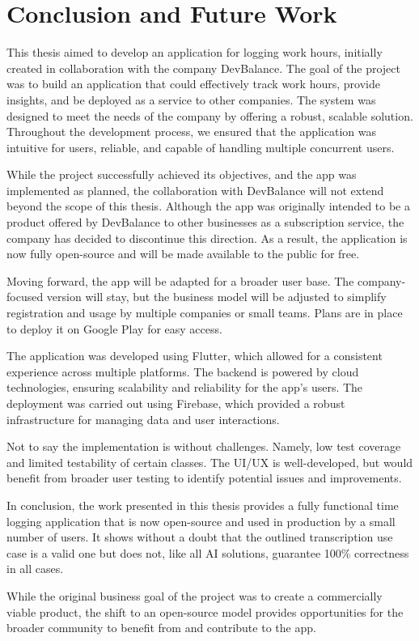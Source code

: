\documentclass[
  digital,     %
  oneside,     %
  nosansbold,  %
  nocolorbold, %
  lof,         %
  lot,         %
]{fithesis4}
\begin{document}
\chapter{Conclusion and Future Work}
\shorthandoff{-}
\begin{markdown}

This thesis aimed to develop an application for logging work hours, initially created in collaboration with the company DevBalance. The goal of the project was to build an application that could effectively track work hours, provide insights, and be deployed as a service to other companies. The system was designed to meet the needs of the company by offering a robust, scalable solution. Throughout the development process, we ensured that the application was intuitive for users, reliable, and capable of handling multiple concurrent users.

While the project successfully achieved its objectives, and the app was implemented as planned, the collaboration with DevBalance will not extend beyond the scope of this thesis. Although the app was originally intended to be a product offered by DevBalance to other businesses as a subscription service, the company has decided to discontinue this direction. As a result, the application is now fully open-source and will be made available to the public for free.

Moving forward, the app will be adapted for a broader user base. The company-focused version will stay, but the business model will be adjusted to simplify registration and usage by multiple companies or small teams. Plans are in place to deploy it on Google Play for easy access.

The application was developed using Flutter, which allowed for a consistent experience across multiple platforms. The backend is powered by cloud technologies, ensuring scalability and reliability for the app’s users. The deployment was carried out using Firebase, which provided a robust infrastructure for managing data and user interactions.

Not to say the implementation is without challenges. Namely, low test coverage and limited testability of certain classes. The UI/UX is well-developed, but would benefit from broader user testing to identify potential issues and improvements.

In conclusion, the work presented in this thesis provides a fully functional time logging application that is now open-source and used in production by a small number of users. It shows without a doubt that the outlined transcription use case is a valid one but does not, like all AI solutions, guarantee 100\% correctness in all cases.

While the original business goal of the project was to create a commercially viable product, the shift to an open-source model provides opportunities for the broader community to benefit from and contribute to the app.

\end{markdown}
\shorthandon{-}
\end{document}
